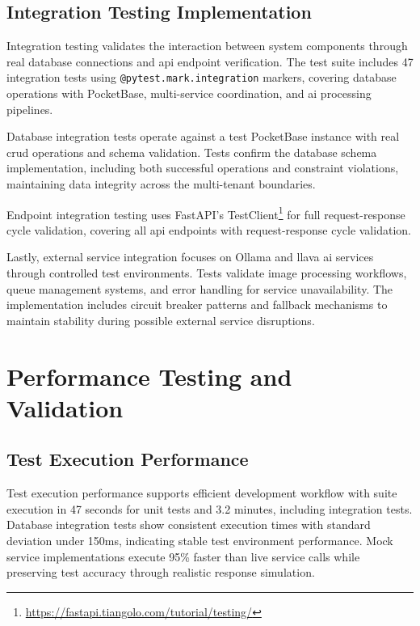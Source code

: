 \subsection{Integration Testing Implementation} \label{subsection:integration_testing_implementation}

Integration testing validates the interaction between system components through real database connections and \ac{api} endpoint verification. The test suite includes 47 integration tests using \texttt{@pytest.mark.integration} markers, covering database operations with PocketBase, multi-service coordination, and \ac{ai} processing pipelines.

Database integration tests operate against a test PocketBase instance with real \ac{crud} operations and schema validation. Tests confirm the database schema implementation, including both successful operations and constraint violations, maintaining data integrity across the multi-tenant boundaries.

Endpoint integration testing uses FastAPI's TestClient\footnote{\url{https://fastapi.tiangolo.com/tutorial/testing/}} for full request-response cycle validation, covering all \ac{api} endpoints with request-response cycle validation.

Lastly, external service integration focuses on Ollama and \ac{llava} \ac{ai} services through controlled test environments. Tests validate image processing workflows, queue management systems, and error handling for service unavailability. The implementation includes circuit breaker patterns and fallback mechanisms to maintain stability during possible external service disruptions.


\section{Performance Testing and Validation} \label{section:performance_testing}

\subsection{Test Execution Performance} \label{subsection:test_execution_performance}

Test execution performance supports efficient development workflow with suite execution in 47 seconds for unit tests and 3.2 minutes, including integration tests. Database integration tests show consistent execution times with standard deviation under 150ms, indicating stable test environment performance. Mock service implementations execute 95\% faster than live service calls while preserving test accuracy through realistic response simulation.

